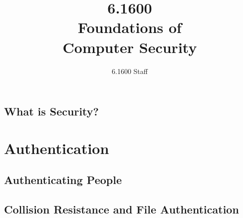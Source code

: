 \documentclass[
letterpaper, %
oneside
]{tufte-book}
\author{6.1600 Staff}
\title{6.1600\\Foundations of\\Computer Security}
\begin{document}
\mainmatter

\maketitle

\clearpage

\tableofcontents*
\clearpage


\chapter{What is Security?}



\part{Authentication}
\chapter{Authenticating People}



\chapter{Collision Resistance and File Authentication}



\backmatter



\end{document}
